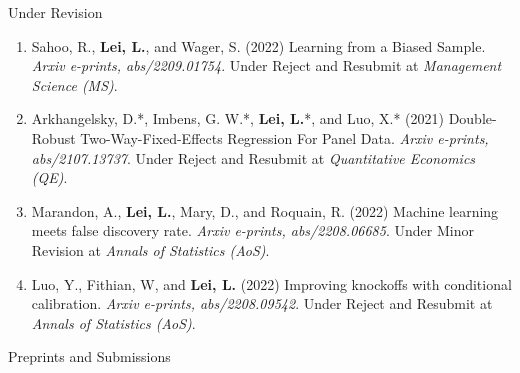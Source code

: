 \documentclass{article}
\begin{document}
\begin{large}
\noindent Under Revision
\end{large}

\begin{enumerate}
\item Sahoo, R., \textbf{Lei, L.}, and Wager, S. (2022) Learning from a Biased Sample. \emph{Arxiv e-prints, abs/2209.01754}. Under Reject and Resubmit at \emph{Management Science (MS)}.
\item Arkhangelsky, D.*, Imbens, G. W.*, \textbf{Lei, L.}*, and Luo, X.* (2021) Double-Robust Two-Way-Fixed-Effects Regression For Panel Data. \emph{Arxiv e-prints, abs/2107.13737}. Under Reject and Resubmit at \emph{Quantitative Economics (QE)}.
\item Marandon, A., \textbf{Lei, L.}, Mary, D., and Roquain, R. (2022) Machine learning meets false discovery rate. \emph{Arxiv e-prints, abs/2208.06685}. Under Minor Revision at \emph{Annals of Statistics (AoS)}.
\item Luo, Y., Fithian, W, and \textbf{Lei, L.} (2022) Improving knockoffs with conditional calibration. \emph{Arxiv e-prints, abs/2208.09542}. Under Reject and Resubmit at \emph{Annals of Statistics (AoS)}.
\end{enumerate}

\begin{large}
\noindent Preprints and Submissions
\end{large}
\end{document}
